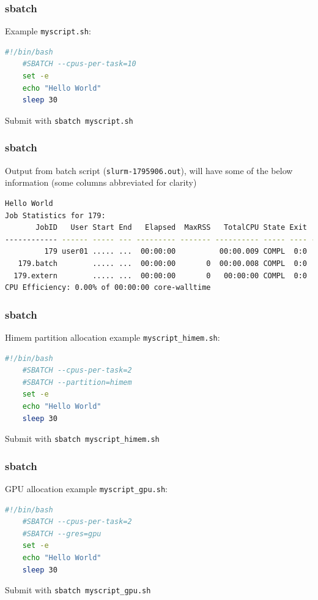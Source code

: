 \documentclass{beamer}
\newcommand{\code}[1]{\colorbox{codegray}{\texttt{#1}}}
\begin{document}
\begin{frame}[fragile]
\frametitle{sbatch}
Example \code{myscript.sh}: 
\begin{lstlisting}[backgroundcolor = \color{codegray}, language = Bash, showstringspaces=false]
    #!/bin/bash
    #SBATCH --cpus-per-task=10
    set -e
    echo "Hello World"
    sleep 30
\end{lstlisting}
\bigskip
\bigskip
Submit with \code{sbatch myscript.sh}
\end{frame}


\begin{frame}[fragile]
\frametitle{sbatch}
Output from batch script (\code{slurm-1795906.out}), will have some of the below information (some columns abbreviated for clarity)
\begingroup
\tiny
\begin{lstlisting}[backgroundcolor = \color{codegray}, language = Bash, showstringspaces=false]
Hello World
Job Statistics for 179:
       JobID   User Start End   Elapsed  MaxRSS   TotalCPU State Exit  NodeList ReqTRES
------------ ------ ----- --- --------- ------- ---------- ----- ---- --------- ----------------
         179 user01 ..... ...  00:00:00          00:00.009 COMPL  0:0    node01  cpu=1,mem=6144M
   179.batch        ..... ...  00:00:00       0  00:00.008 COMPL  0:0    node01
  179.extern        ..... ...  00:00:00       0   00:00:00 COMPL  0:0    node01
CPU Efficiency: 0.00% of 00:00:00 core-walltime
\end{lstlisting}
\endgroup
\end{frame}


\begin{frame}[fragile]
\frametitle{sbatch}
Himem partition allocation example \code{myscript\_himem.sh}: 
\begin{lstlisting}[backgroundcolor = \color{codegray}, language = Bash, showstringspaces=false]
    #!/bin/bash
    #SBATCH --cpus-per-task=2
    #SBATCH --partition=himem
    set -e
    echo "Hello World"
    sleep 30
\end{lstlisting}
\bigskip
\bigskip
Submit with \code{sbatch myscript\_himem.sh}
\end{frame}


\begin{frame}[fragile]
\frametitle{sbatch}
GPU allocation example \code{myscript\_gpu.sh}: 
\begin{lstlisting}[backgroundcolor = \color{codegray}, language = Bash, showstringspaces=false]
    #!/bin/bash
    #SBATCH --cpus-per-task=2
    #SBATCH --gres=gpu
    set -e
    echo "Hello World"
    sleep 30
\end{lstlisting}
\bigskip
\bigskip
Submit with \code{sbatch myscript\_gpu.sh}
\end{frame}
\end{document}

